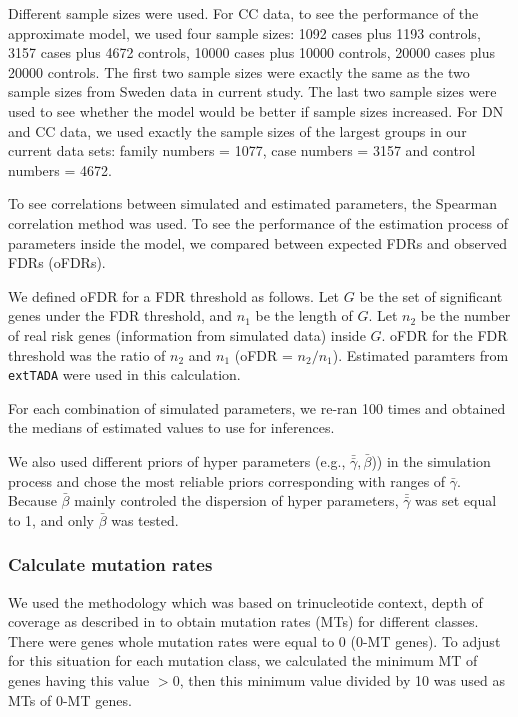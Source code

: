 \documentclass[]{article}
\begin{document}
Different sample sizes were used. For CC data, to see the
performance of the approximate model, we used four sample sizes: 1092
cases plus 1193 controls, 3157 cases plus 4672 controls, 10000 cases
plus 10000 controls, 20000 cases plus 20000 controls. The first two
sample sizes were exactly the same as the two sample sizes from Sweden
data in current study. The last two sample sizes were used to see
whether the model would be better if sample sizes increased. For DN
and CC data, we used exactly the sample sizes of the largest groups in
our current data sets: family numbers = 1077,
case numbers = 3157 and control numbers = 4672.


To see correlations between simulated and estimated parameters,
the Spearman correlation method \citep{spearman1904proof} was used.
To see the performance of the estimation process of parameters inside
the model, we compared between expected FDRs and observed FDRs (oFDRs).

We defined oFDR for a FDR threshold as
follows. Let $G$ be the set of significant genes under the FDR
threshold, and $n_1$ be the length of $G$. Let $n_2$ be the number of real risk genes (information
from simulated data) inside $G$. oFDR for the FDR threshold was the
ratio of $n_2$ and $n_1$ (oFDR = $n_2/n_1$). Estimated paramters from
\texttt{extTADA} were used in this calculation.

For each combination of simulated parameters, we re-ran 100 times and obtained the medians of
estimated values to use for inferences.

We also used different priors of hyper parameters (e.g., $\bar{\bar{\gamma}},  \bar{\beta}$)) in the simulation process and chose the most reliable
priors corresponding with ranges of $\bar{\gamma}$. Because
$\bar{\beta}$ mainly controled the dispersion of hyper parameters, $\bar{\bar{\gamma}}$ was set equal to 1, and only $\bar{\beta}$ was
tested.


\subsubsection{Calculate mutation rates}

We used the methodology which was based on trinucleotide context,
depth of coverage as described in \cite{fromer2014novo} to obtain
mutation rates (MTs) for different classes. There were genes whole mutation
rates were equal to 0 (0-MT genes). To adjust for this situation for each mutation
class, we calculated the minimum MT of genes having this
value $> 0$, then this minimum value divided by 10 was used as MTs of 0-MT genes.
\end{document}
